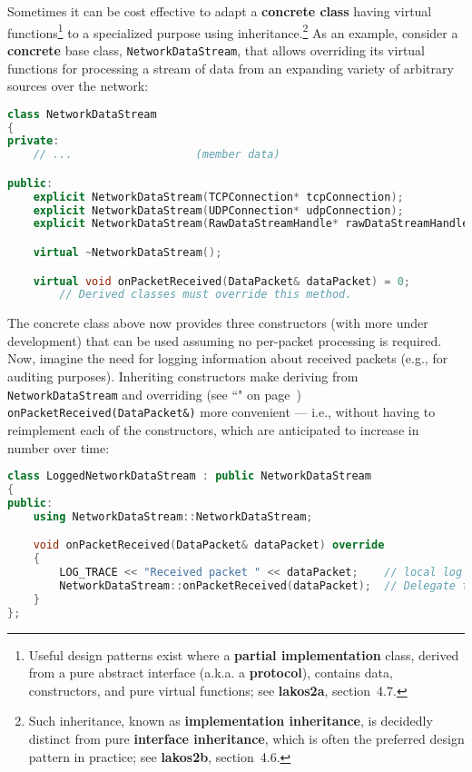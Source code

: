 Sometimes it can be cost effective to adapt a \textbf{concrete class}
having virtual functions{\cprotect\footnote{Useful design patterns
exist where a \textbf{partial implementation} class, derived from a
pure abstract interface (a.k.a. a \textbf{protocol}), contains data,
constructors, and pure virtual functions; see
  \textbf{lakos2a}, section~4.7.}} to a specialized purpose
using inheritance.{\cprotect\footnote{Such inheritance, known as
\textbf{implementation inheritance}, is decidedly distinct from pure
\textbf{interface inheritance}, which is often the preferred design
  pattern in practice; see \textbf{{lakos2b}}, section~4.6.}}
As an example, consider a \textbf{concrete} base class,
\texttt{NetworkDataStream}, that allows overriding its virtual functions
for processing a stream of data from an expanding variety of arbitrary
sources over the network:

\begin{lstlisting}[language=C++]
class NetworkDataStream
{
private:
    // ...                   (member data)

public:
    explicit NetworkDataStream(TCPConnection* tcpConnection);
    explicit NetworkDataStream(UDPConnection* udpConnection);
    explicit NetworkDataStream(RawDataStreamHandle* rawDataStreamHandle);

    virtual ~NetworkDataStream();

    virtual void onPacketReceived(DataPacket& dataPacket) = 0;
        // Derived classes must override this method.
\end{lstlisting}

\noindent The concrete class above now provides three constructors (with more
under development) that can be used assuming no per-packet processing is
required. Now, imagine the need for logging information about received
packets (e.g., for auditing purposes). Inheriting constructors make
deriving from \texttt{NetworkDataStream} and overriding (see
``" on page~\pageref{override})
\texttt{onPacketReceived(DataPacket\&)} more convenient --- i.e.,
without having to reimplement each of the constructors, which are
anticipated to increase in number over time:

\begin{lstlisting}[language=C++]
class LoggedNetworkDataStream : public NetworkDataStream
{
public:
    using NetworkDataStream::NetworkDataStream;

    void onPacketReceived(DataPacket& dataPacket) override
    {
        LOG_TRACE << "Received packet " << dataPacket;    // local log facility
        NetworkDataStream::onPacketReceived(dataPacket);  // Delegate to base.
    }
};
\end{lstlisting}


